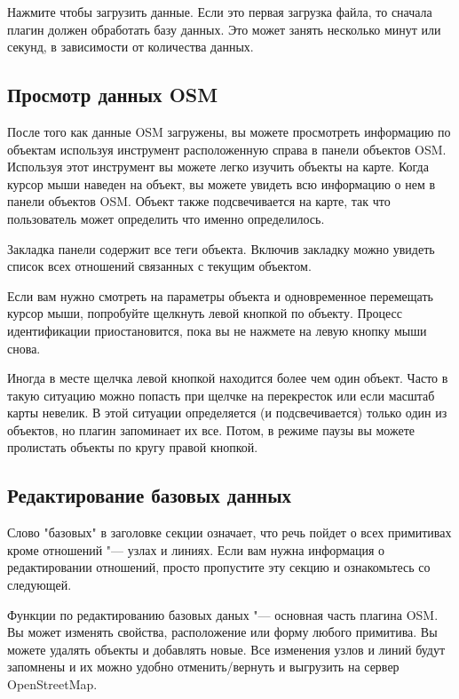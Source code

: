Нажмите  чтобы загрузить данные. Если это первая загрузка
файла, то сначала плагин должен обработать базу данных. Это может занять
несколько минут или секунд, в зависимости от количества данных.

\subsection{Просмотр данных OSM}

После того как данные OSM загружены, вы можете просмотреть информацию по
объектам используя инструмент 
расположенную справа в панели объектов OSM. Используя этот инструмент вы
можете легко изучить объекты на карте. Когда курсор мыши наведен на
объект, вы можете увидеть всю информацию о нем в панели объектов OSM.
Объект также подсвечивается на карте, так что пользователь может
определить что именно определилось.

Закладка  панели содержит все теги объекта. Включив
закладку  можно увидеть список всех отношений связанных
с текущим объектом.

Если вам нужно смотреть на параметры объекта и одновременное перемещать
курсор мыши, попробуйте щелкнуть левой кнопкой по объекту. Процесс
идентификации приостановится, пока вы не нажмете на левую кнопку мыши
снова.

Иногда в месте щелчка левой кнопкой находится более чем один объект.
Часто в такую ситуацию можно попасть при щелчке на перекресток или если
масштаб карты невелик. В этой ситуации определяется (и подсвечивается)
только один из объектов, но плагин запоминает их все. Потом, в режиме
паузы вы можете пролистать объекты по кругу правой кнопкой.

\subsection{Редактирование базовых данных}

Слово "базовых" в заголовке секции означает, что речь пойдет о всех
примитивах кроме отношений "--- узлах и линиях. Если вам нужна информация
о редактировании отношений, просто пропустите эту секцию и ознакомьтесь
со следующей.

Функции по редактированию базовых даных "--- основная часть плагина OSM.
Вы может изменять свойства, расположение или форму любого примитива. Вы
можете удалять объекты и добавлять новые. Все изменения узлов и линий
будут запомнены и их можно удобно отменить/вернуть и выгрузить на сервер
OpenStreetMap.

